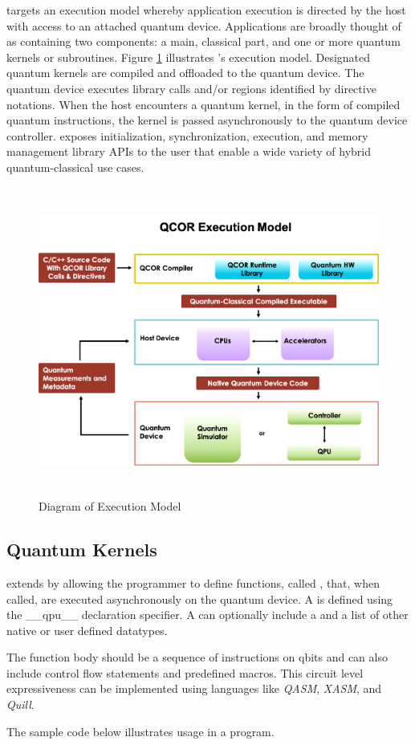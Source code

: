 \qcor targets an execution model whereby application execution is directed by the host with access to an attached quantum device. Applications are broadly thought of as containing two components: a main, classical part, and one or more quantum kernels or subroutines. Figure \ref{fig:exec_model} illustrates \qcor's execution model. Designated quantum kernels are compiled and offloaded to the quantum device. The quantum device executes \qcor library calls and/or \qcor regions identified by directive notations. When the host encounters a quantum kernel, in the form of compiled quantum instructions, the kernel is passed asynchronously to the quantum device controller.
\qcor exposes initialization, synchronization, execution, and memory management library \ac{API}s to the user that enable a wide variety of hybrid quantum-classical use cases.

\begin{figure}
 \centering
 \includegraphics[width=5in,height=4in]{figures/Execution_Model_Illustration_v3.png}
  \caption{Diagram of \qcor Execution Model}
  \label{fig:exec_model}
\end{figure}


\subsection{\textbf{Quantum Kernels}}\label{subsec:kernel}
\qcor extends \CorCpp by allowing the programmer to define functions, called , that, when called, are executed asynchronously on the quantum device. A  is defined using the \_\_qpu\_\_ declaration specifier. A  can optionally include a \qcor {} and a list of other native or user defined \CorCpp datatypes.

The  function body should be a sequence of instructions on qbits and can also include control flow statements and predefined macros.  This circuit level expressiveness can be implemented using languages like \textit{QASM}, \textit{XASM}, and \textit{Quill}. 

The sample code below illustrates  usage in a \CorCpp program.
